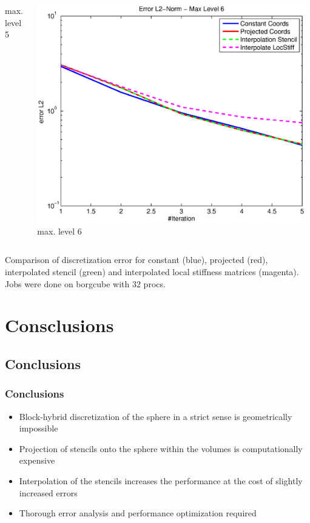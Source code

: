 \documentclass[t,compress=false,usepdftitle=false]{beamer}
\begin{document}
\begin{frame}
\begin{columns}[T]
\begin{column}[T]{4.3cm}
  max. level 5
\end{column}\hfill
\begin{column}[T]{4.3cm} 
  \centering
  \includegraphics[width=0.98\textwidth]{spherestokes_errorEuc_level6}\\
  max. level 6
\end{column}
\end{columns}
\vspace{0.5cm}
\centering
Comparison of discretization error for constant (blue), projected (red), interpolated
stencil (green) and interpolated local stiffness matrices (magenta).
Jobs were done on borgcube with 32 procs.
\end{frame}

%
\section{Consclusions}
\subsection{Conclusions}
%
\begin{frame}\frametitle{Conclusions}
%
\begin{itemize}
 \item Block-hybrid discretization of the sphere in a strict sense is geometrically impossible
 \item Projection of stencils onto the sphere within the volumes is computationally expensive
 \item Interpolation of the stencils increases the performance at the cost of slightly increased errors
 \item Thorough error analysis and performance optimization required
\end{itemize}

%
\end{frame}
%
\end{document}
